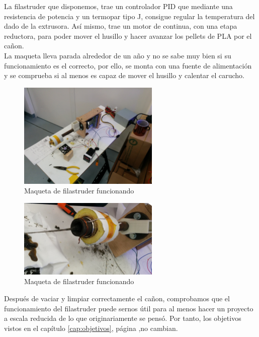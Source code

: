 La filastruder que disponemos, trae un controlador PID que mediante una resistencia de potencia y un termopar tipo J, consigue regular la temperatura del dado de la extrusora. Así mismo, trae un motor de continua, con una etapa reductora, para poder mover el husillo y hacer avanzar los pellets de PLA por el cañon.\\

La maqueta lleva parada alrededor de un año y no se sabe muy bien si su funcionamiento es el correcto, por ello, se monta con una fuente de alimentación y se comprueba si al menos es capaz de mover el husillo y calentar el carucho.\\

	\begin{figure}[H]
            \centering
            \includegraphics[width=0.6\textwidth]{images/filaextruder/IMG_20150225_093400.jpg}
            \caption{Maqueta de filastruder funcionando}
            \label{fig:hardware_filastruder2}
    \end{figure}
    	\begin{figure}[H]
            \centering
            \includegraphics[width=0.6\textwidth]{images/filaextruder/IMG_20150225_124525.jpg}
            \caption{Maqueta de filastruder funcionando}
            \label{fig:hardware_filastruder3}
    \end{figure}

Después de vaciar y limpiar correctamente el cañon, comprobamos que el funcionamiento del filastruder puede sernos útil para al menos hacer un proyecto a escala reducida de lo que originariamente se pensó. Por tanto, los objetivos vistos en el capítulo \ref{cap:objetivos}, página \pageref{cap:objetivos},no cambian.\\

